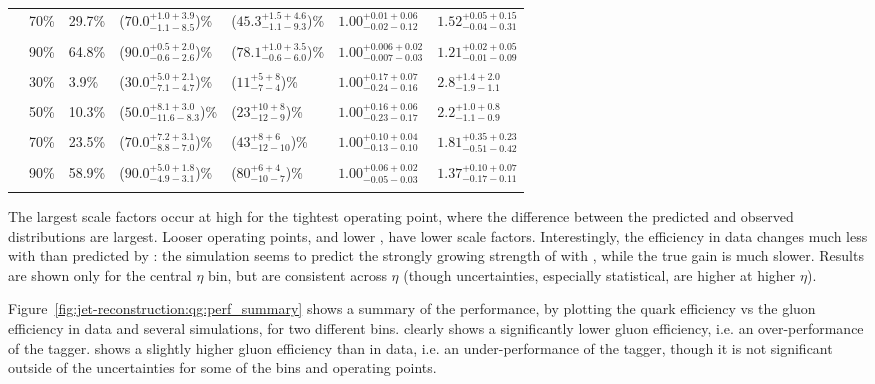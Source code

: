 \begin{table}[htbp]
\begin{center}
\begin{tabular}{|c|l|l|l|l|l|l|}
& 70\% & 29.7\% &  ($70.0^{+1.0+3.9}_{-1.1-8.5}$)\%  & ($45.3^{+1.5+4.6}_{-1.1-9.3}$)\% & $1.00^{+0.01+0.06}_{-0.02-0.12}$ & $1.52^{+0.05+0.15}_{-0.04-0.31}$ \\ &&&&&&\\
& 90\% & 64.8\% &  ($90.0^{+0.5+2.0}_{-0.6-2.6}$)\%  & ($78.1^{+1.0+3.5}_{-0.6-6.0}$)\% & $1.00^{+0.006+0.02}_{-0.007-0.03}$ & $1.21^{+0.02+0.05}_{-0.01-0.09}$ \\ &&&&&&\\
\hline\noalign{\smallskip}
\multirow{4}{*}{\begin{sideways}\centering$\pt=310$--$360 \GeV$\end{sideways}} 
& 30\% &  3.9\% & ($30.0^{+5.0+2.1}_{-7.1-4.7}$)\% & ($11^{+5+8}_{-7-4}$)\% & $1.00^{+0.17+0.07}_{-0.24-0.16}$ & $2.8^{+1.4+2.0}_{-1.9-1.1}$ \\&&&&&&\\
& 50\% & 10.3\% & ($50.0^{+8.1+3.0}_{-11.6-8.3}$)\%& ($23^{+10+8}_{-12-9}$)\%& $1.00^{+0.16+0.06}_{-0.23-0.17}$ & $2.2^{+1.0+0.8}_{-1.1-0.9}$ \\&&&&&&\\
& 70\% & 23.5\% & ($70.0^{+7.2+3.1}_{-8.8-7.0}$)\% & ($43^{+8+6}_{-12-10}$)\% & $1.00^{+0.10+0.04}_{-0.13-0.10}$ & $1.81^{+0.35+0.23}_{-0.51-0.42}$ \\&&&&&&\\
& 90\% & 58.9\% & ($90.0^{+5.0+1.8}_{-4.9-3.1}$)\% & ($80^{+6+4}_{-10-7}$)\% & $1.00^{+0.06+0.02}_{-0.05-0.03}$ & $1.37^{+0.10+0.07}_{-0.17-0.11}$ \\&&&&&&\\
\hline
\end{tabular}
\end{center}
\end{table}

The largest scale factors occur at high \pt for the tightest operating point, where the difference between the predicted and observed \ntrk distributions are largest. Looser operating points, and lower \pt, have lower scale factors. Interestingly, the efficiency in data changes much less with \pt than predicted by \Pythia: the simulation seems to predict the strongly growing strength of \ntrk with \pt, while the true gain is much slower. Results are shown only for the central $\eta$ bin, but are consistent across $\eta$ (though uncertainties, especially statistical, are higher at higher $\eta$).

Figure~\ref{fig:jet-reconstruction:qg:perf_summary} shows a summary of the performance, by plotting the quark efficiency vs the gluon efficiency in data and several simulations, for two different \pt bins. \Pythia clearly shows a significantly lower gluon efficiency, i.e. an over-performance of the tagger. \Herwigpp shows a slightly higher gluon efficiency than in data, i.e. an under-performance of the tagger, though it is not significant outside of the uncertainties for some of the \pt bins and operating points.

